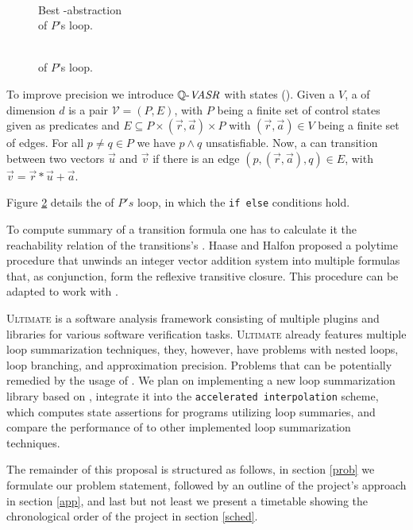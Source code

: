 \begin{minipage}[t]{0.35\linewidth} \centering
	\begin{figure}[H]
			
			\caption{\\ Best \qvasr-abstraction \\ of $P$'s loop.}
			\label{vasr}
	\end{figure}
\end{minipage}
\begin{minipage}[t]{0.3\linewidth} \centering
	\begin{figure}[H]
		
		\caption{\\ \qvasrs of $P$'s loop.}
		\label{vasrs}
	\end{figure}
\end{minipage}
\vspace*{1cm}

To improve precision we introduce $\mathit{\mathbb{Q} \text{-}VASR}$ with states (\qvasrs). Given a \qvasr $V$, a \qvasrs of dimension $d$ is a pair $\mathcal{V} = (P, E)$, with $P$ being a finite set of control states given as predicates and $E \subseteq P \times (\vec{r}, \vec{a}) \times P$ with $(\vec{r}, \vec{a}) \in V$ being a finite set of edges. For all $p \neq q \in P$ we have $p \land q$ unsatisfiable. Now, a \qvasrs can transition between two vectors $\vec{u}$ and $\vec{v}$ if there is an edge $(p, (\vec{r}, \vec{a}), q) \in E$, with $\vec{v} = \vec{r} * \vec{u} + \vec{a}$. \par
Figure \ref{vasrs} details the \qvasrs of $P's$ loop, in which the \texttt{if else} conditions hold. \par
To compute summary of a transition formula one has to calculate it the reachability relation of the transitions's \qvasrs. Haase and Halfon \cite{DBLP:conf/rp/HaaseH14} proposed a polytime procedure that unwinds an integer vector addition system into multiple formulas that, as conjunction, form the reflexive transitive closure. This procedure can be adapted to work with \qvasrs. \\ \par

\textsc{Ultimate}\cite{Zitat02} is a software analysis framework consisting of multiple plugins and libraries for various software verification tasks. \textsc{Ultimate} already features multiple loop summarization techniques, they, however, have problems with nested loops, loop branching, and approximation precision. Problems that can be potentially remedied by the usage of \qvasrs. We plan on implementing a new loop summarization library based on \qvasrs, integrate it into the \texttt{accelerated interpolation} scheme, which computes state assertions for programs utilizing loop summaries, and compare the performance of \qvasrs to other implemented loop summarization techniques. \par
The remainder of this proposal is structured as follows, in section \ref{prob} we formulate our problem statement, followed by an outline of the project's approach in section \ref{app}, and last but not least we present a timetable showing the chronological order of the project in section \ref{sched}.
